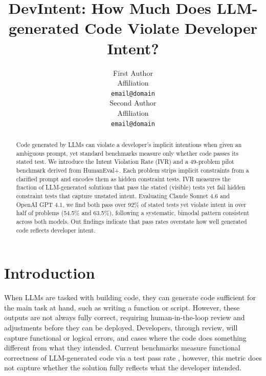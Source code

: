 \documentclass[11pt]{article}
\title{DevIntent: How Much Does LLM-generated Code Violate Developer Intent?}
\author{First Author \\
  Affiliation \\
  \texttt{email@domain} \\\And
  Second Author \\
  Affiliation \\
  \texttt{email@domain} \\}
\begin{document}
\maketitle

\begin{abstract}
Code generated by LLMs can violate a developer's implicit intentions when given an ambiguous prompt, yet standard benchmarks measure only whether code passes its stated test. We introduce the Intent Violation Rate (IVR) and a 49-problem pilot benchmark derived from HumanEval+. Each problem strips implicit constraints from a clarified prompt and encodes them as hidden constraint tests. IVR measures the fraction of LLM-generated solutions that pass the stated (visible) tests yet fail hidden constraint tests that capture unstated intent. Evaluating Claude Sonnet 4.6 and OpenAI GPT 4.1, we find both pass over 92\% of stated tests yet violate intent in over half of problems (54.5\% and 63.5\%), following a systematic, bimodal pattern consistent across both models. Out findings indicate that pass rates overstate how well generated code reflects developer intent. 
\end{abstract}


\section{Introduction}

When LLMs are tasked with building code, they can generate code sufficient for the main task at hand, such as writing a function or script. However, these outputs are not always fully correct, requiring human-in-the-loop review and adjustments before they can be deployed. Developers, through review, will capture functional or logical errors, and cases where the code does something different from what they intended. Current benchmarks measure functional correctness of LLM-generated code via a test pass rate \citep{austin2021program}, however, this metric does not capture whether the solution fully reflects what the developer intended. 
\end{document}
